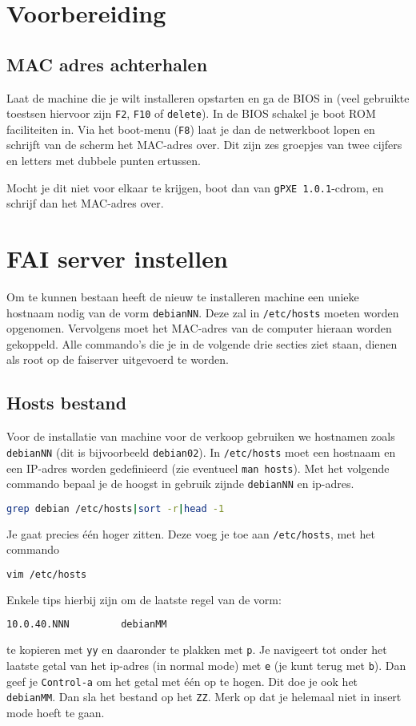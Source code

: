 \section{Voorbereiding}
\subsection{MAC adres achterhalen}
Laat de machine die je wilt installeren opstarten en ga de BIOS in (veel gebruikte toestsen hiervoor zijn \texttt{F2}, \texttt{F10} of \texttt{delete}). In de BIOS schakel je boot ROM faciliteiten in. Via het boot-menu (\texttt{F8}) laat je dan de netwerkboot lopen en schrijft van de scherm het MAC-adres over. Dit zijn zes groepjes van twee cijfers en letters met dubbele punten ertussen. 

Mocht je dit niet voor elkaar te krijgen, boot dan van \texttt{gPXE 1.0.1}-cdrom, en schrijf dan het MAC-adres over.

\section{FAI server instellen}
Om te kunnen bestaan heeft de nieuw te installeren machine een unieke hostnaam nodig van de vorm \texttt{debianNN}. Deze zal in \texttt{/etc/hosts} moeten worden opgenomen. Vervolgens moet het MAC-adres van de computer hieraan worden gekoppeld. Alle commando's die je in de volgende drie secties ziet staan, dienen als root op de faiserver uitgevoerd te worden.
\subsection{Hosts bestand}
Voor de installatie van machine voor de verkoop gebruiken we hostnamen zoals \texttt{debianNN} (dit is bijvoorbeeld \texttt{debian02}).
In \texttt{/etc/hosts} moet een hostnaam en een IP-adres worden gedefinieerd (zie eventueel \texttt{man hosts}). Met het volgende commando bepaal je de hoogst in gebruik zijnde \texttt{debianNN} en ip-adres.  
\begin{lstlisting}[language=bash]
grep debian /etc/hosts|sort -r|head -1
\end{lstlisting}
Je gaat precies \'{e}\'{e}n hoger zitten. Deze voeg je toe aan \texttt{/etc/hosts}, met het commando
\begin{lstlisting}[language=bash]
vim /etc/hosts
\end{lstlisting}
Enkele tips hierbij zijn om de laatste regel van de vorm:
\begin{lstlisting}[language=bash]
10.0.40.NNN			debianMM
\end{lstlisting}
te kopieren met \texttt{yy} en daaronder te plakken met \texttt{p}. Je navigeert tot onder het laatste getal van het ip-adres (in normal mode) met \texttt{e} (je kunt terug met \texttt{b}). Dan geef je \texttt{Control-a} om het getal met \'{e}\'{e}n op te hogen. Dit doe je ook het \texttt{debianMM}. Dan sla het bestand op het \texttt{ZZ}. Merk op dat je helemaal niet in insert mode hoeft te gaan.
